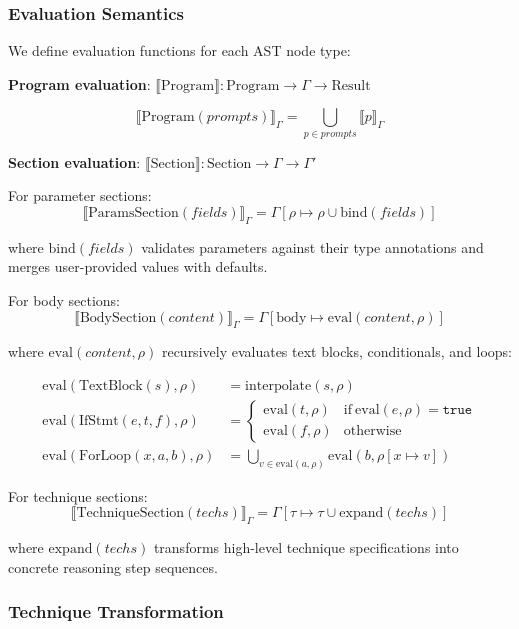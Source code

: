 \documentclass[11pt,a4paper]{article}
\begin{document}
\subsubsection{Evaluation Semantics}

We define evaluation functions for each AST node type:

\textbf{Program evaluation}: $\llbracket \text{Program} \rrbracket : \text{Program} \rightarrow \Gamma \rightarrow \text{Result}$

$$\llbracket \text{Program}(prompts) \rrbracket_\Gamma = \bigcup_{p \in prompts} \llbracket p \rrbracket_\Gamma$$

\textbf{Section evaluation}: $\llbracket \text{Section} \rrbracket : \text{Section} \rightarrow \Gamma \rightarrow \Gamma'$

For parameter sections:
$$\llbracket \text{ParamsSection}(fields) \rrbracket_\Gamma = \Gamma[\rho \mapsto \rho \cup \text{bind}(fields)]$$

where $\text{bind}(fields)$ validates parameters against their type annotations and merges user-provided values with defaults.

For body sections:
$$\llbracket \text{BodySection}(content) \rrbracket_\Gamma = \Gamma[\text{body} \mapsto \text{eval}(content, \rho)]$$

where $\text{eval}(content, \rho)$ recursively evaluates text blocks, conditionals, and loops:

\begin{align*}
\text{eval}(\text{TextBlock}(s), \rho) &= \text{interpolate}(s, \rho) \\
\text{eval}(\text{IfStmt}(e, t, f), \rho) &=
\begin{cases}
\text{eval}(t, \rho) & \text{if}\ \text{eval}(e, \rho) = \texttt{true} \\
\text{eval}(f, \rho) & \text{otherwise}
\end{cases} \\
\text{eval}(\text{ForLoop}(x, a, b), \rho) &= \bigcup_{v \in \text{eval}(a, \rho)} \text{eval}(b, \rho[x \mapsto v])
\end{align*}

For technique sections:
$$\llbracket \text{TechniqueSection}(techs) \rrbracket_\Gamma = \Gamma[\tau \mapsto \tau \cup \text{expand}(techs)]$$

where $\text{expand}(techs)$ transforms high-level technique specifications into concrete reasoning step sequences.

\subsubsection{Technique Transformation}
\end{document}
